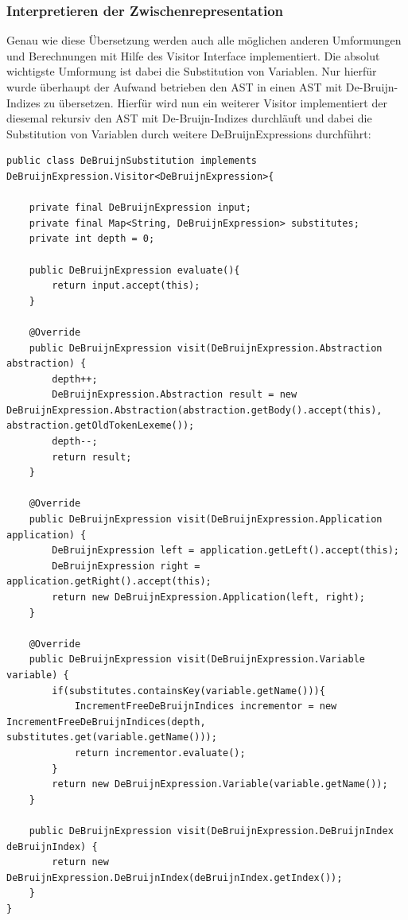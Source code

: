 \documentclass[ngerman]{article}
\begin{document}
\subsubsection{Interpretieren der Zwischenrepresentation}

Genau wie diese Übersetzung werden auch alle möglichen anderen Umformungen und Berechnungen mit Hilfe des Visitor Interface implementiert. Die absolut wichtigste Umformung ist dabei die Substitution von Variablen. Nur hierfür wurde überhaupt der Aufwand betrieben den AST in einen AST mit De-Bruijn-Indizes zu übersetzen.
Hierfür wird nun ein weiterer Visitor implementiert der diesemal rekursiv den AST mit De-Bruijn-Indizes durchläuft und dabei die Substitution von Variablen durch weitere DeBruijnExpressions durchführt:

\begin{lstlisting}[caption={TODO: Referenz zu Anhang}, captionpos=b]
public class DeBruijnSubstitution implements DeBruijnExpression.Visitor<DeBruijnExpression>{

    private final DeBruijnExpression input;
    private final Map<String, DeBruijnExpression> substitutes;
    private int depth = 0;

    public DeBruijnExpression evaluate(){
        return input.accept(this);
    }

    @Override
    public DeBruijnExpression visit(DeBruijnExpression.Abstraction abstraction) {
        depth++;
        DeBruijnExpression.Abstraction result = new DeBruijnExpression.Abstraction(abstraction.getBody().accept(this), abstraction.getOldTokenLexeme());
        depth--;
        return result;
    }

    @Override
    public DeBruijnExpression visit(DeBruijnExpression.Application application) {
        DeBruijnExpression left = application.getLeft().accept(this);
        DeBruijnExpression right = application.getRight().accept(this);
        return new DeBruijnExpression.Application(left, right);
    }

    @Override
    public DeBruijnExpression visit(DeBruijnExpression.Variable variable) {
        if(substitutes.containsKey(variable.getName())){
            IncrementFreeDeBruijnIndices incrementor = new IncrementFreeDeBruijnIndices(depth, substitutes.get(variable.getName()));
            return incrementor.evaluate();
        }
        return new DeBruijnExpression.Variable(variable.getName());
    }

    public DeBruijnExpression visit(DeBruijnExpression.DeBruijnIndex deBruijnIndex) {
        return new DeBruijnExpression.DeBruijnIndex(deBruijnIndex.getIndex());
    }
}
\end{lstlisting}
\end{document}
